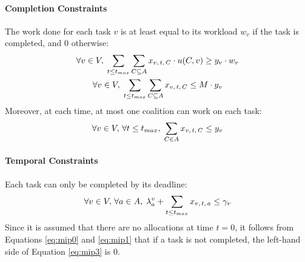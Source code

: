 \paragraph{Completion Constraints}
The work done for each task $v$ is at least equal to its workload $w_v$ if the task is
completed, and $0$ otherwise:
\begin{gather}
    \forall v \in V,\; \sum_{t \leq t_{max}} \sum_{C \subseteq A} x_{v,\, t,\, C} \cdot u(C, v) \geq
    y_v \cdot w_v\label{eq:mip0}\\
    \forall v \in V,\; \sum_{t \leq t_{max}} \sum_{C \subseteq A} x_{v,\, t,\, C} \leq M \cdot y_v\label{eq:mip1}
\end{gather}
Moreover, at each time, at most one coalition can work on each task:
\begin{equation}\label{eq:mip2}
    \forall v \in V,\, \forall t \leq t_{max},\; \sum_{C \in A} x_{v,\, t,\, C} \leq y_v
\end{equation}

\paragraph{Temporal Constraints}
Each task can only be completed by its deadline:
\begin{equation}\label{eq:mip3}
    \forall v \in V,\, \forall a \in A,\; \lambda^v_a + \sum_{t \leq t_{max}} x_{v,\, t,\, a} \leq \gamma_v
\end{equation}
Since it is assumed that there are no allocations at time $t = 0$, it follows from
Equations \ref{eq:mip0} and \ref{eq:mip1} that if a task is not completed, the left-hand
side of Equation \ref{eq:mip3} is $0$.

